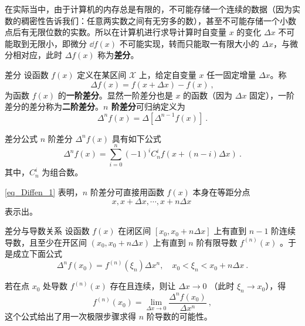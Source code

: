 在实际当中，由于计算机的内存总是有限的，不可能存储一个连续的数据（因为实数的稠密性告诉我们：任意两实数之间有无穷多的数），甚至不可能存储一个小数点后有无限位数的实数。所以在计算机进行求导计算时自变量 $x$ 的变化 $\Delta x$ 不可能取到无限小，即微分 $\dd f({x})$ 不可能实现，转而只能取一有限大小的 $\Delta x$，与微分相对应，此时 $\Delta f(x)$ 称为\textbf{差分}。
\begin{definition}{差分}
设函数 $f(x)$ 定义在某区间 $\mathcal{X}$ 上，给定自变量 $x$ 任一固定增量 $\Delta x$。称
\begin{equation}
\Delta f(x)=f(x+\Delta x)-f(x)~,
\end{equation}
为函数 $f(x)$ 的\textbf{一阶差分}。显然一阶差分也是 $x$ 的函数（因为 $\Delta x$ 固定），一阶差分的差分称为\textbf{二阶差分}。\textbf{$n$ 阶差分}可归纳定义为
\begin{equation}
\Delta^n f(x)=\Delta[\Delta^{n-1}f(x)]~.
\end{equation}
\end{definition}
\begin{theorem}{差分公式}\label{the_Diffen_1}
$n$ 阶差分 $\Delta^n f(x)$ 具有如下公式
\begin{equation}\label{eq_Diffen_1}
\Delta^nf(x)=\sum_{i=0}^n(-1)^iC_n^if(x+(n-i)\Delta x)~.
\end{equation}
其中，$C_n^i$ 为组合数。
\end{theorem}
\autoref{eq_Diffen_1} 表明，$n$ 阶差分可直接用函数 $f(x)$ 本身在等距分点
\begin{equation}
x,x+\Delta x,\cdots,x+n\Delta x~
\end{equation}
表示出。
\begin{theorem}{差分与导数关系}\label{the_Diffen_2}
设函数 $f(x)$ 在闭区间 $[x_0,x_0+n\Delta x]$ 上有直到 $n-1$ 阶连续导数，且至少在开区间 $(x_0,x_0+n\Delta x)$ 上有直到 $n$ 阶有限导数 $f^{(n)}(x)$ 。于是成立下面公式
\begin{equation}\label{eq_Diffen_2}
\Delta^nf(x_0)=f^{(n)}(\xi_n)\Delta x^n ,\quad x_0<\xi_n<x_0+n\Delta x~.
\end{equation}
\end{theorem}
若在点 $x_0$ 处导数 $f^{(n)}(x)$ 存在且连续，则让 $\Delta x\rightarrow0$ （此时 $\xi_n\rightarrow x_0$），得
\begin{equation}
f^{(n)}(x_0)=\lim_{\Delta x\rightarrow0}\frac{\Delta^n f(x_0)}{\Delta x^n}~,
\end{equation}
 这个公式给出了用一次极限步骤求得 $n$ 阶导数的可能性。
